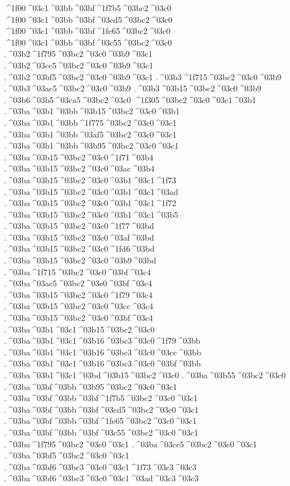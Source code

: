 {^^^^1f00^^^^03c1^^^^03bb^^^^03bf^^^^1f7b5^^^^03bc2^^^^03c0  ^^^^1f00^^^^03c1^^^^03bb^^^^03bf^^^^03cd5^^^^03bc2^^^^03c0
^^^^1f00^^^^03c1^^^^03bb^^^^03bf^^^^1fe65^^^^03bc2^^^^03c0
^^^^1f00^^^^03c1^^^^03bb^^^^03bf^^^^03c55^^^^03bc2^^^^03c0
.^^^^03b2^^^^1f795^^^^03bc2^^^^03c0^^^^03b9^^^^03c1  .^^^^03b2^^^^03cc5^^^^03bc2^^^^03c0^^^^03b9^^^^03c1
.^^^^03b2^^^^03bf5^^^^03bc2^^^^03c0^^^^03b9^^^^03c1
.^^^^03b3^^^^1f715^^^^03bc2^^^^03c0^^^^03b9  .^^^^03b3^^^^03ac5^^^^03bc2^^^^03c0^^^^03b9
.^^^^03b3^^^^03b15^^^^03bc2^^^^03c0^^^^03b9
.^^^^03b6^^^^03b5^^^^03ca5^^^^03bc2^^^^03c0
^^^^1f305^^^^03bc2^^^^03c0^^^^03c1^^^^03b1
.^^^^03ba^^^^03b1^^^^03bb^^^^03b15^^^^03bc2^^^^03c0^^^^03b1
.^^^^03ba^^^^03b1^^^^03bb^^^^1f775^^^^03bc2^^^^03c0^^^^03c1  .^^^^03ba^^^^03b1^^^^03bb^^^^03af5^^^^03bc2^^^^03c0^^^^03c1
.^^^^03ba^^^^03b1^^^^03bb^^^^03b95^^^^03bc2^^^^03c0^^^^03c1
.^^^^03ba^^^^03b15^^^^03bc2^^^^03c0^^^^1f71^^^^03b4  .^^^^03ba^^^^03b15^^^^03bc2^^^^03c0^^^^03ac^^^^03b4
.^^^^03ba^^^^03b15^^^^03bc2^^^^03c0^^^^03b1^^^^03c1^^^^1f73  .^^^^03ba^^^^03b15^^^^03bc2^^^^03c0^^^^03b1^^^^03c1^^^^03ad
.^^^^03ba^^^^03b15^^^^03bc2^^^^03c0^^^^03b1^^^^03c1^^^^1f72
.^^^^03ba^^^^03b15^^^^03bc2^^^^03c0^^^^03b1^^^^03c1^^^^03b5
.^^^^03ba^^^^03b15^^^^03bc2^^^^03c0^^^^1f77^^^^03bd  .^^^^03ba^^^^03b15^^^^03bc2^^^^03c0^^^^03af^^^^03bd
.^^^^03ba^^^^03b15^^^^03bc2^^^^03c0^^^^1fd6^^^^03bd
.^^^^03ba^^^^03b15^^^^03bc2^^^^03c0^^^^03b9^^^^03bd
.^^^^03ba^^^^1f715^^^^03bc2^^^^03c0^^^^03bf^^^^03c4  .^^^^03ba^^^^03ac5^^^^03bc2^^^^03c0^^^^03bf^^^^03c4
.^^^^03ba^^^^03b15^^^^03bc2^^^^03c0^^^^1f79^^^^03c4  .^^^^03ba^^^^03b15^^^^03bc2^^^^03c0^^^^03cc^^^^03c4
.^^^^03ba^^^^03b15^^^^03bc2^^^^03c0^^^^03bf^^^^03c4
.^^^^03ba^^^^03b1^^^^03c1^^^^03b15^^^^03bc2^^^^03c0
.^^^^03ba^^^^03b1^^^^03c1^^^^03b16^^^^03bc3^^^^03c0^^^^1f79^^^^03bb  .^^^^03ba^^^^03b1^^^^03c1^^^^03b16^^^^03bc3^^^^03c0^^^^03cc^^^^03bb
.^^^^03ba^^^^03b1^^^^03c1^^^^03b16^^^^03bc3^^^^03c0^^^^03bf^^^^03bb
.^^^^03ba^^^^03b1^^^^03c1^^^^03bd^^^^03b15^^^^03bc2^^^^03c0
.^^^^03ba^^^^03b55^^^^03bc2^^^^03c0
.^^^^03ba^^^^03bf^^^^03bb^^^^03b95^^^^03bc2^^^^03c0^^^^03c1
.^^^^03ba^^^^03bf^^^^03bb^^^^03bf^^^^1f7b5^^^^03bc2^^^^03c0^^^^03c1  .^^^^03ba^^^^03bf^^^^03bb^^^^03bf^^^^03cd5^^^^03bc2^^^^03c0^^^^03c1
.^^^^03ba^^^^03bf^^^^03bb^^^^03bf^^^^1fe65^^^^03bc2^^^^03c0^^^^03c1
.^^^^03ba^^^^03bf^^^^03bb^^^^03bf^^^^03c55^^^^03bc2^^^^03c0^^^^03c1
.^^^^03ba^^^^1f795^^^^03bc2^^^^03c0^^^^03c1  .^^^^03ba^^^^03cc5^^^^03bc2^^^^03c0^^^^03c1
.^^^^03ba^^^^03bf5^^^^03bc2^^^^03c0^^^^03c1
.^^^^03ba^^^^03bf6^^^^03bc3^^^^03c0^^^^03c1^^^^1f73^^^^03c3^^^^03c3  .^^^^03ba^^^^03bf6^^^^03bc3^^^^03c0^^^^03c1^^^^03ad^^^^03c3^^^^03c3
}
